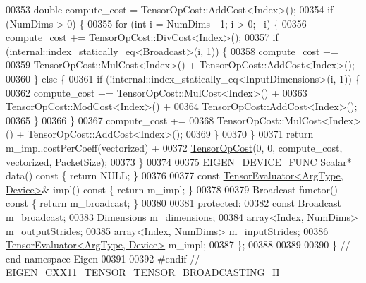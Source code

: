 \begin{DoxyCode}
00353     \textcolor{keywordtype}{double} compute\_cost = TensorOpCost::AddCost<Index>();
00354     \textcolor{keywordflow}{if} (NumDims > 0) \{
00355       \textcolor{keywordflow}{for} (\textcolor{keywordtype}{int} i = NumDims - 1; i > 0; --i) \{
00356         compute\_cost += TensorOpCost::DivCost<Index>();
00357         \textcolor{keywordflow}{if} (internal::index\_statically\_eq<Broadcast>(i, 1)) \{
00358           compute\_cost +=
00359               TensorOpCost::MulCost<Index>() + TensorOpCost::AddCost<Index>();
00360         \} \textcolor{keywordflow}{else} \{
00361           \textcolor{keywordflow}{if} (!internal::index\_statically\_eq<InputDimensions>(i, 1)) \{
00362             compute\_cost += TensorOpCost::MulCost<Index>() +
00363                             TensorOpCost::ModCost<Index>() +
00364                             TensorOpCost::AddCost<Index>();
00365           \}
00366         \}
00367         compute\_cost +=
00368             TensorOpCost::MulCost<Index>() + TensorOpCost::AddCost<Index>();
00369       \}
00370     \}
00371     \textcolor{keywordflow}{return} m\_impl.costPerCoeff(vectorized) +
00372            \hyperlink{class_eigen_1_1_tensor_op_cost}{TensorOpCost}(0, 0, compute\_cost, vectorized, PacketSize);
00373   \}
00374 
00375   EIGEN\_DEVICE\_FUNC Scalar* data()\textcolor{keyword}{ const }\{ \textcolor{keywordflow}{return} NULL; \}
00376 
00377   \textcolor{keyword}{const} \hyperlink{struct_eigen_1_1_tensor_evaluator}{TensorEvaluator<ArgType, Device>}& impl()\textcolor{keyword}{ const }\{ \textcolor{keywordflow}{return} m\_impl; \}
00378 
00379   Broadcast functor()\textcolor{keyword}{ const }\{ \textcolor{keywordflow}{return} m\_broadcast; \}
00380 
00381  \textcolor{keyword}{protected}:
00382   \textcolor{keyword}{const} Broadcast m\_broadcast;
00383   Dimensions m\_dimensions;
00384   \hyperlink{class_eigen_1_1array}{array<Index, NumDims>} m\_outputStrides;
00385   \hyperlink{class_eigen_1_1array}{array<Index, NumDims>} m\_inputStrides;
00386   \hyperlink{struct_eigen_1_1_tensor_evaluator}{TensorEvaluator<ArgType, Device>} m\_impl;
00387 \};
00388 
00389 
00390 \} \textcolor{comment}{// end namespace Eigen}
00391 
00392 \textcolor{preprocessor}{#endif // EIGEN\_CXX11\_TENSOR\_TENSOR\_BROADCASTING\_H}
\end{DoxyCode}

